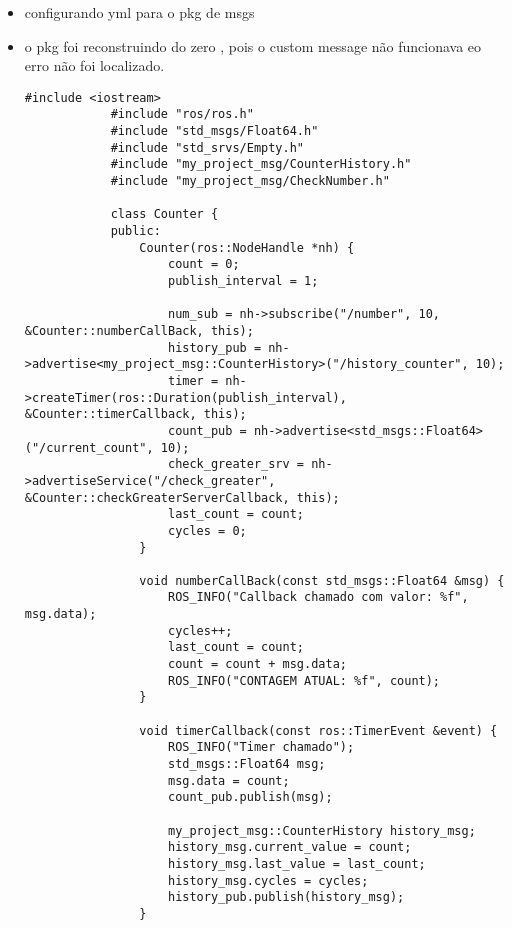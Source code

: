 \documentclass[letterpaper]{article}
\begin{document}
\begin{itemize}
\begin{lstlisting}[style=bashstyle, title=]
        \end{lstlisting}
        \item configurando yml para o pkg de msgs
        
        \item o pkg foi reconstruindo do zero , pois o custom message não funcionava eo erro não foi localizado.
        \begin{lstlisting}[style=cppStyle, title=src/nome\_project/src/counter.cpp]
            #include <iostream>
            #include "ros/ros.h"
            #include "std_msgs/Float64.h"
            #include "std_srvs/Empty.h"
            #include "my_project_msg/CounterHistory.h"
            #include "my_project_msg/CheckNumber.h"
            
            class Counter {
            public:
                Counter(ros::NodeHandle *nh) {
                    count = 0;
                    publish_interval = 1;
            
                    num_sub = nh->subscribe("/number", 10, &Counter::numberCallBack, this);
                    history_pub = nh->advertise<my_project_msg::CounterHistory>("/history_counter", 10);
                    timer = nh->createTimer(ros::Duration(publish_interval), &Counter::timerCallback, this);
                    count_pub = nh->advertise<std_msgs::Float64>("/current_count", 10);
                    check_greater_srv = nh->advertiseService("/check_greater", &Counter::checkGreaterServerCallback, this);
                    last_count = count;
                    cycles = 0;
                }
            
                void numberCallBack(const std_msgs::Float64 &msg) {
                    ROS_INFO("Callback chamado com valor: %f", msg.data);
                    cycles++;
                    last_count = count;
                    count = count + msg.data;
                    ROS_INFO("CONTAGEM ATUAL: %f", count);
                }
            
                void timerCallback(const ros::TimerEvent &event) {
                    ROS_INFO("Timer chamado");
                    std_msgs::Float64 msg;
                    msg.data = count;
                    count_pub.publish(msg);
            
                    my_project_msg::CounterHistory history_msg;
                    history_msg.current_value = count;
                    history_msg.last_value = last_count;
                    history_msg.cycles = cycles;
                    history_pub.publish(history_msg);
                }
            

\end{lstlisting}
\end{itemize}
\end{document}
